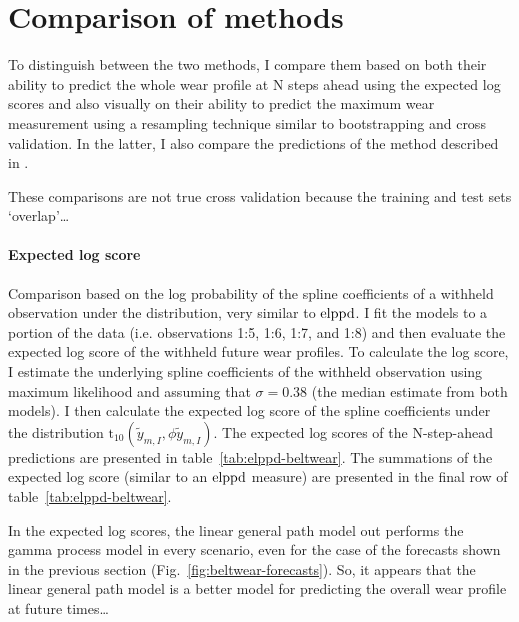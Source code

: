 \section{Comparison of methods}

To distinguish between the two methods, I compare them based on both their ability to predict the whole wear profile at N steps ahead using the expected log scores and also visually on their ability to predict the maximum wear measurement using a resampling technique similar to bootstrapping and cross validation. In the latter, I also compare the predictions of the method described in \citet{webb_2020}.

These comparisons are not true cross validation because the training and test sets `overlap'\ldots

\paragraph*{Expected log score}
Comparison based on the log probability of the spline coefficients of a withheld observation under the distribution, very similar to $\hbox{elppd}$. I fit the models to a portion of the data (i.e. observations 1:5, 1:6, 1:7, and 1:8) and then evaluate the expected log score of the withheld future wear profiles. To calculate the log score, I estimate the underlying spline coefficients of the withheld observation using maximum likelihood and assuming that $\sigma = 0.38$ (the median estimate from both models). I then calculate the expected log score of the spline coefficients under the distribution $\mbox{t}_{10}(\tilde{y}_{m, I}, \phi \tilde{y}_{m, I})$. The expected log scores of the N-step-ahead predictions are presented in table~\ref{tab:elppd-beltwear}. The summations of the expected log score (similar to an $\hbox{elppd}$ measure) are presented in the final row of table~\ref{tab:elppd-beltwear}.



In the expected log scores, the linear general path model out performs the gamma process model in every scenario, even for the case of the forecasts shown in the previous section (Fig.~\ref{fig:beltwear-forecasts}). So, it appears that the linear general path model is a better model for predicting the overall wear profile at future times\ldots

